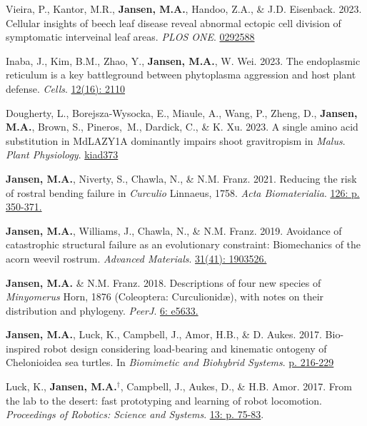 \documentclass[12pt,a4paper]{article}
\begin{document}
\begin{description}
		\item Vieira, P., Kantor, M.R., \textbf{Jansen, M.A.}, Handoo, Z.A., \& J.D. Eisenback. 2023. Cellular insights of beech leaf disease reveal abnormal ectopic cell division of symptomatic interveinal leaf areas. \textit{PLOS ONE}. \href{https://doi.org/10.1371/journal.pone.0292588}{0292588}
		
		\item Inaba, J., Kim, B.M., Zhao, Y., \textbf{Jansen, M.A.}, W. Wei. 2023. The endoplasmic reticulum is a key battleground between phytoplasma aggression and host plant defense. \textit{Cells}. \href{https://doi.org/10.3390/cells12162110}{12(16): 2110}
		
		\item Dougherty, L., Borejsza-Wysocka, E., Miaule, A., Wang, P., Zheng, D., \textbf{Jansen, M.A.}, Brown, S., Pineros,~M., Dardick, C., \& K. Xu. 2023. A single amino acid substitution in MdLAZY1A dominantly impairs shoot gravitropism in \textit{Malus}. \textit{Plant Physiology}. \href{https://doi.org/10.1093/plphys/kiad373}{kiad373}
		
		\item \textbf{Jansen, M.A.}, Niverty, S., Chawla, N., \& N.M. Franz. 2021. Reducing the risk of rostral bending failure in \textit{Curculio} Linnaeus, 1758. \textit{Acta Biomaterialia}. \href{https://doi.org/10.1016/j.actbio.2021.03.029}{126: p. 350-371.}
		
		\item \textbf{Jansen, M.A.}, Williams, J., Chawla, N., \& N.M. Franz. 2019. Avoidance of catastrophic structural failure as an evolutionary constraint: Biomechanics of the acorn weevil rostrum. \textit{Advanced Materials}. \href{https://doi.org/10.1002/adma.201903526}{31(41): 1903526.}
		
		\item \textbf{Jansen, M.A.} \& N.M. Franz. 2018. Descriptions of four new species of \textit{Minyomerus} Horn, 1876 (Coleoptera: Curculionid\ae), with notes on their distribution and phylogeny. \textit{PeerJ}. \href{https://peerj.com/articles/5633/}{6: e5633.}
		
		\item \textbf{Jansen, M.A.}, Luck, K., Campbell, J., Amor, H.B., \& D. Aukes. 2017. Bio-inspired robot design considering load-bearing and kinematic ontogeny of Chelonioidea sea turtles. In \textit{Biomimetic and Biohybrid Systems}. \href{http://www.springer.com/us/book/9783319635361}{p. 216-229}
		
		\item Luck, K., \textbf{Jansen, M.A.}$^\dagger$, Campbell, J., Aukes, D., \& H.B. Amor. 2017. From the lab to the desert: fast prototyping and learning of robot locomotion. \textit{Proceedings of Robotics: Science and Systems}. \href{http://www.roboticsproceedings.org/rss13/p75.html}{13: p. 75-83}.
		

\end{description}
\end{document}
